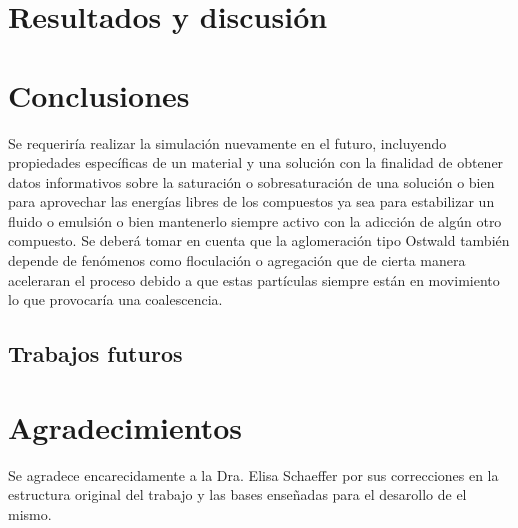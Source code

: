 \documentclass[3pt,twocolumn]{elsarticle}
\begin{document}
\section{Resultados y discusión}

\section{Conclusiones}

Se requeriría realizar la simulación nuevamente en el futuro, incluyendo propiedades específicas de un material y una solución con la finalidad de obtener datos informativos sobre la saturación o sobresaturación de una solución o bien para aprovechar las energías libres de los compuestos ya sea para estabilizar un fluido o emulsión o bien mantenerlo siempre activo con la adicción de algún otro compuesto.
Se deberá tomar en cuenta que la aglomeración tipo Ostwald también depende de fenómenos como floculación o agregación que de cierta manera aceleraran el proceso debido a que estas partículas siempre están en movimiento lo que provocaría una coalescencia.

\subsection{Trabajos futuros}

\section{Agradecimientos}
Se agradece encarecidamente a la Dra. Elisa Schaeffer por sus correcciones en la estructura original del trabajo y las bases enseñadas para el desarollo de el mismo.


\end{document}
